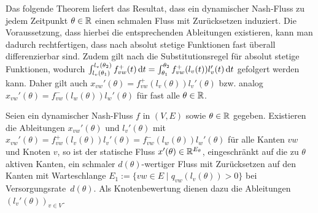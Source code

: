 Das folgende Theorem liefert das Resultat, dass ein dynamischer Nash-Fluss zu jedem Zeitpunkt $\theta\in\mathbb{R}$ einen schmalen Fluss mit Zurücksetzen induziert.
Die Voraussetzung, dass hierbei die entsprechenden Ableitungen existieren, kann man dadurch rechtfertigen, dass nach \cite[Folgerung~4.12~b)]{Elstrodt2011Abs} absolut stetige Funktionen fast überall differenzierbar sind.
Zudem gilt nach \cite[Aufgabe~4.10]{Elstrodt2011Abs} die Substitutionsregel für absolut stetige Funktionen, wodurch $\int_{l_v(\theta_1)}^{l_v(\theta_2)} f_{vw}^+(t) \mathop{}\!\mathrm{d} t = \int_{\theta_1}^{\theta_2} f_{vw}^+(l_v(t)) l_v'(t) \mathop{}\!\mathrm{d} t$ gefolgert werden kann.
Daher gilt auch $x_{vw}'(\theta) = f_{vw}^+(l_v(\theta))l_v'(\theta)$ bzw. analog $x_{vw}'(\theta) = f_{vw}^-(l_w(\theta)) l_w'(\theta)$ für fast alle $\theta\in\mathbb{R}$.

\begin{theorem}
	Seien ein dynamischer Nash-Fluss $f$ in $(V,E)$ sowie $\theta\in\mathbb{R}$ gegeben.
	Existieren die Ableitungen $x_{vw}'(\theta)$ und $l_v'(\theta)$ mit $x_{vw}'(\theta) = f_{vw}^+(l_v(\theta)) l_v'(\theta)= f_{vw}^-(l_w(\theta))l_w'(\theta)$ für alle Kanten $vw$ und Knoten $v$, so ist der statische Fluss $x'(\theta) \in \mathbb{R}^{E_\theta}$, eingeschränkt auf die zu $\theta$ aktiven Kanten, ein schmaler $d(\theta)$-wertiger Fluss mit Zurücksetzen auf den Kanten mit Warteschlange $E_1:=\{vw\in E \mid q_{vw}(l_v(\theta))>0 \}$ bei Versorgungsrate~$d(\theta)$.
	Als Knotenbewertung dienen dazu die Ableitungen $(l_v'(\theta))_{v\in V}$.
\end{theorem}
